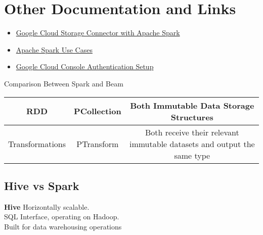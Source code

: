 \documentclass[english]{article}
\begin{document}
\section{Other Documentation and Links}
\begin{itemize}
\item \href{https://cloud.google.com/dataproc/docs/tutorials/gcs-connector-spark-tutorial}{Google Cloud Storage Connector with Apache Spark}
\item \href{https://www.qubole.com/blog/apache-spark-use-cases/}{Apache Spark Use Cases}
\item \href{https://cloud.google.com/docs/authentication/getting-started}{Google Cloud Console Authentication Setup}
\end{itemize}
Comparison Between Spark and Beam
\begin{center}
\begin{tabular}{|c|c|c|}
\hline
RDD & PCollection & Both Immutable Data Storage Structures \\ \hline
Transformations & PTransform & Both receive their relevant immutable datasets and output the same type
\end{tabular}
\end{center}

\subsection{Hive vs Spark}
\textbf{Hive}
Horizontally scalable. \\
SQL Interface, operating on Hadoop. \\
Built for data warehousing operations \\
\end{document}
